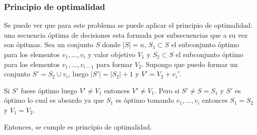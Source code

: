 \subsubsection{Principio de optimalidad}
\par Se puede ver que para este problema se puede aplicar el principio de optimalidad: una secuencia \'optima de
decisiones esta formada por subsecuencias que a su vez son \'opitmas.
Sea un conjunto $S$ donde $|S|=n$, $S_1\subset S$ el subconjunto \'optimo 
para los elementos $v_1, ... , v_i$  y valor objetivo
$V_1$ y $S_2\subset S$ el subconjunto \'optimo para los elementos $v_1, ..., v_{i-1}$ para formar $V_2$.
Supongo que puedo formar un conjunto $S' = S_2\cup {v_i}$, luego $|S'| = |S_2| + 1$ y $V'= V_2 + v_i'$.
\par Si $S'$ fuese \'optimo luego $V'\neq V_1$ entonces $V'\neq V_1$. Pero si $S'\neq S=S_1$ 
y $S'$ es \'optimo lo cual es
absurdo ya que $S_1$ es \'optimo tomando $v_1,...,v_i$ entonces $S_1=S_2$ y $V_1 = V_2$.
\par Entonces, se cumple es principio de optimalidad.

